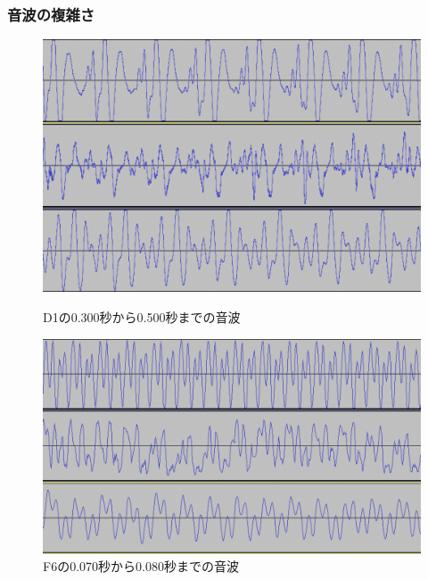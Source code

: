 \subsubsection{音波の複雑さ}

\begin{figure}[t]
\begin{center}
\begin{minipage}{0.48\hsize}
\begin{center}
\includegraphics[width=0.9\hsize]{figure/66_22_det/d1_0300_0500.png}
\caption{D1の0.300秒から0.500秒までの音波}
\label{fig:66_22_bad1}
\end{center}
\end{minipage}
\begin{minipage}{0.48\hsize}
\begin{center}
\includegraphics[width=0.9\hsize]{figure/66_22_det/f6_0070_0080.png}
\caption{F6の0.070秒から0.080秒までの音波}
\label{fig:66_22_bad2}
\end{center}
\end{minipage}
\end{center}
\end{figure}

